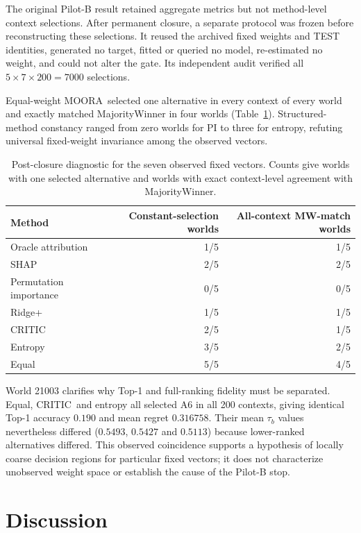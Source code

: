 \documentclass[runningheads]{llncs}
\newcommand{\MOORA}{MOORA}
\newcommand{\CRITIC}{CRITIC}
\begin{document}
The original Pilot-B result retained aggregate metrics but not method-level context selections.
After permanent closure, a separate protocol was frozen before reconstructing these selections.
It reused the archived fixed weights and TEST identities, generated no target, fitted or queried
no model, re-estimated no weight, and could not alter the gate. Its independent audit verified
all $5\times7\times200=7000$ selections.

Equal-weight \MOORA\ selected one alternative in every context of every world and exactly
matched MajorityWinner in four worlds (Table~\ref{tab:selectionmaps}). Structured-method
constancy ranged from zero worlds for PI to three for entropy, refuting universal fixed-weight
invariance among the observed vectors.

\begin{table}[t]
\centering
\caption{Post-closure diagnostic for the seven observed fixed vectors. Counts give worlds with
one selected alternative and worlds with exact context-level agreement with MajorityWinner.}
\label{tab:selectionmaps}
\small
\begin{tabular}{@{}lrr@{}}
\toprule
Method & Constant-selection worlds & All-context MW-match worlds\\
\midrule
Oracle attribution & 1/5 & 1/5\\
SHAP & 2/5 & 2/5\\
Permutation importance & 0/5 & 0/5\\
Ridge+ & 1/5 & 1/5\\
CRITIC & 2/5 & 1/5\\
Entropy & 3/5 & 2/5\\
Equal & 5/5 & 4/5\\
\bottomrule
\end{tabular}
\end{table}

World 21003 clarifies why Top-1 and full-ranking fidelity must be separated. Equal, \CRITIC\ and
entropy all selected A6 in all 200 contexts, giving identical Top-1 accuracy $0.190$ and mean
regret $0.316758$. Their mean $\tau_b$ values nevertheless differed ($0.5493$, $0.5427$ and
$0.5113$) because lower-ranked alternatives differed. This observed coincidence supports a
hypothesis of locally coarse decision regions for particular fixed vectors; it does not
characterize unobserved weight space or establish the cause of the Pilot-B stop.

\section{Discussion}
\label{sec:discussion}
\end{document}
